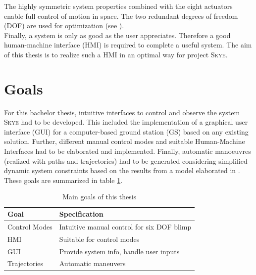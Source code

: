 The highly symmetric system properties combined with the eight actuators enable full control of motion in space. The two redundant degrees of freedom (DOF) are used for optimization (see \cite{schaffnervu}).  \\
Finally, a system is only as good as the user appreciates. Therefore a good human-machine interface (HMI) is required to complete a useful system. The aim of this thesis is to realize such a HMI in an optimal way for project \textsc{Skye}.
\section{Goals}
\label{sec:goals}
For this bachelor thesis, intuitive interfaces to control and observe the system \textsc{Skye} had to be developed. This included the implementation of a graphical user interface (GUI) for a computer-based ground station (GS) based on any existing solution. Further, different manual control modes and suitable Human-Machine Interfaces had to be elaborated and implemented. Finally, automatic manoeuvres (realized with paths and trajectories) had to be generated considering simplified dynamic system constraints based on the results from a model elaborated in \cite{weichart}. These goals are summarized in table \ref{tab:goals}. \\

\begin{table}[H]
\begin{center}
 \begin{tabular}{ll}
 \hline
 Goal & Specification  \\ \hline \hline
 Control Modes 	& 	Intuitive manual control for six DOF blimp \\
 HMI			&	Suitable for control modes \\
 GUI         	& 	Provide system info, handle user inputs \\
 Trajectories   & 	Automatic maneuvers \\
 \hline
 \end{tabular}
 \caption{Main goals of this thesis}\vspace{1ex}
 \label{tab:goals}
\end{center}
\end{table}

